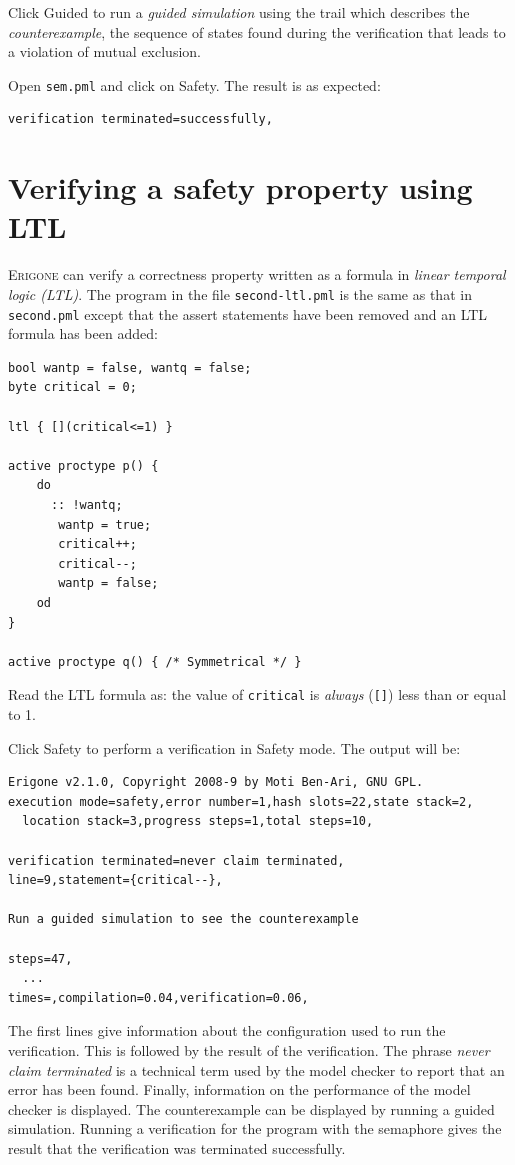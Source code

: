 \documentclass[11pt]{article}
\newcommand*{\prg}{\textsc{Erigone}}
\newcommand*{\p}[1]{\texttt{#1}}
\newcommand*{\bu}[1]{\textsf{#1}}
\begin{document}
Click \bu{Guided} to run a \emph{guided simulation} using the trail
which describes the \emph{counterexample}, the sequence of states found
during the verification that leads to a violation of mutual exclusion.

Open \p{sem.pml} and click on \bu{Safety}. The result is as expected:
\begin{verbatim}
verification terminated=successfully,
\end{verbatim}

\section{Verifying a safety property using LTL}

\prg{} can verify a correctness property written as a formula in
\emph{linear temporal logic (LTL)}.
The program in the file \p{second-ltl.pml} is the same as that in
\p{second.pml} except that the assert statements have been removed
and an LTL formula has been added:
\begin{verbatim}
bool wantp = false, wantq = false;
byte critical = 0;

ltl { [](critical<=1) }

active proctype p() {
    do 
	  :: !wantq;
       wantp = true;
       critical++;
       critical--;
       wantp = false;
    od
}

active proctype q() { /* Symmetrical */ }
\end{verbatim}
Read the LTL formula as: the value of \p{critical} is \emph{always}
(\p{[]}) less than or equal to 1.

Click \bu{Safety} to perform a verification in Safety mode. The output
will be:

\begin{verbatim}
Erigone v2.1.0, Copyright 2008-9 by Moti Ben-Ari, GNU GPL.
execution mode=safety,error number=1,hash slots=22,state stack=2,
  location stack=3,progress steps=1,total steps=10,

verification terminated=never claim terminated,
line=9,statement={critical--},

Run a guided simulation to see the counterexample

steps=47,
  ...
times=,compilation=0.04,verification=0.06,
\end{verbatim}

The first lines give information about the configuration used to run the
verification. This is followed by the result of the verification. The
phrase \emph{never claim terminated} is a technical term used by the
model checker to report that an error has been found. Finally,
information on the performance of the model checker is displayed. The
counterexample can be displayed by running a guided simulation.
Running a verification for the program with the semaphore gives the
result that the verification was terminated successfully.
\end{document}
